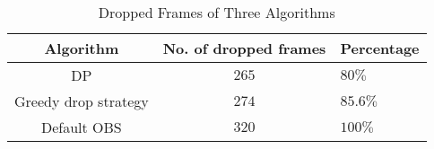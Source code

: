 \begin{table}[tb]
\centering
\caption{Dropped Frames of Three Algorithms}
\label{tab_drop}
{\setlength{\tabcolsep}{1pt}
\begin{tabular}{|c|c|l|}
\hline
\textbf{Algorithm} & \textbf{No. of dropped frames}   &\textbf{Percentage}     \\ \hline
DP           &$265$          &$80\%$           \\ \hline
Greedy drop strategy       &$274$      &$85.6\%$              \\ \hline
Default OBS       &$320$  &$100\%$ \\ \hline
\end{tabular}}
\end{table}
